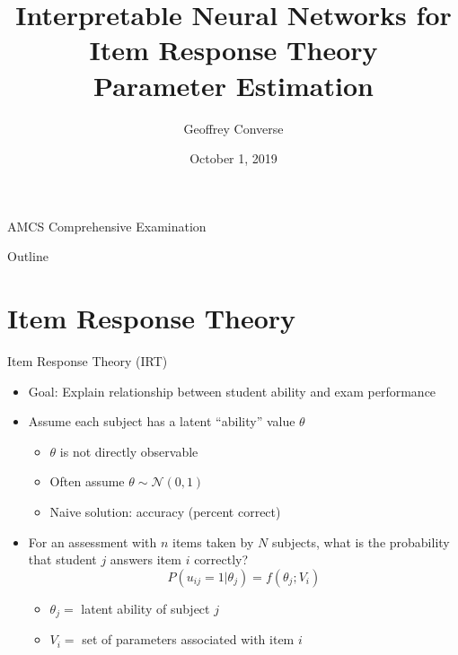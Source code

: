 \documentclass{beamer}
\title[Interpretable ANN for IRT Parameter Estimation]{Interpretable Neural Networks for\\ Item Response Theory\\ Parameter Estimation}
\author{Geoffrey Converse}
\institute{University of Iowa}
\date{October 1, 2019}
\def \d{\ensuremath \delta}
\theoremstyle{definition}
\begin{document}
\begin{frame}
  \titlepage
  \begin{center}
  {\scriptsize AMCS Comprehensive Examination}
  \end{center}
\end{frame}


\begin{frame}{Outline}
  \tableofcontents
\end{frame}


\section{Item Response Theory}

\begin{frame}{Item Response Theory (IRT)}
\begin{itemize}
  \item Goal: Explain relationship between student ability and exam performance
  \item Assume each subject has a latent ``ability'' value $\theta$
  \begin{itemize}
    \item<2-> $\theta$ is not directly observable
    \item<2-> Often assume $\theta \sim \mathcal{N}(0,1)$
    \item<2-> Naive solution: accuracy (percent correct)
  \end{itemize}
  \item<3> For an assessment with $n$ items taken by $N$ subjects, what is the probability that student $j$ answers item $i$ correctly?
  \[P(u_{ij}=1 | \theta_j) = f(\theta_j; V_i)\]
  \begin{itemize}
    \item<3> $\theta_j =$ latent ability of subject $j$
    \item<3> $V_i =$ set of parameters associated with item $i$
  \end{itemize}
\end{itemize}
\end{frame}

\end{document}
